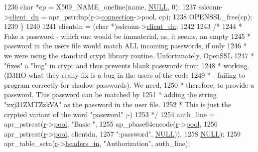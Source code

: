 \begin{DoxyCode}
{1236         \textcolor{keywordtype}{char} *cp = X509\_NAME\_oneline(name, \hyperlink{pcre_8txt_ad7f989d16aa8ca809a36bc392c07fba1}{NULL}, 0);
1237         sslconn->\hyperlink{structSSLConnRec_a2a646856abf462c90dfbe70e82e52173}{client\_dn} = apr\_pstrdup(\hyperlink{group__APACHE__CORE__CONFIG_ga091cdd45984e865a888a4f8bb8fe107a}{r}->\hyperlink{structrequest__rec_a0924aae55826638314f76952ca5d60b1}{connection}->pool, cp);
1238         OPENSSL\_free(cp);
1239     \}
1240 
1241     clientdn = (\textcolor{keywordtype}{char} *)sslconn->\hyperlink{structSSLConnRec_a2a646856abf462c90dfbe70e82e52173}{client\_dn};
1242 
1243     \textcolor{comment}{/*}
1244 \textcolor{comment}{     * Fake a password - which one would be immaterial, as, it seems, an empty}
1245 \textcolor{comment}{     * password in the users file would match ALL incoming passwords, if only}
1246 \textcolor{comment}{     * we were using the standard crypt library routine. Unfortunately, OpenSSL}
1247 \textcolor{comment}{     * "fixes" a "bug" in crypt and thus prevents blank passwords from}
1248 \textcolor{comment}{     * working.  (IMHO what they really fix is a bug in the users of the code}
1249 \textcolor{comment}{     * - failing to program correctly for shadow passwords).  We need,}
1250 \textcolor{comment}{     * therefore, to provide a password. This password can be matched by}
1251 \textcolor{comment}{     * adding the string "xxj31ZMTZzkVA" as the password in the user file.}
1252 \textcolor{comment}{     * This is just the crypted variant of the word "password" ;-)}
1253 \textcolor{comment}{     */}
1254     auth\_line = apr\_pstrcat(\hyperlink{group__APACHE__CORE__CONFIG_ga091cdd45984e865a888a4f8bb8fe107a}{r}->\hyperlink{structrequest__rec_aa0a0c16f9a9ab3901cdb3f3c9c9d83d0}{pool}, \textcolor{stringliteral}{"Basic "},
1255                             ap\_pbase64encode(\hyperlink{group__APACHE__CORE__CONFIG_ga091cdd45984e865a888a4f8bb8fe107a}{r}->\hyperlink{structrequest__rec_aa0a0c16f9a9ab3901cdb3f3c9c9d83d0}{pool},
1256                                              apr\_pstrcat(\hyperlink{group__APACHE__CORE__CONFIG_ga091cdd45984e865a888a4f8bb8fe107a}{r}->\hyperlink{structrequest__rec_aa0a0c16f9a9ab3901cdb3f3c9c9d83d0}{pool}, clientdn,
1257                                                          \textcolor{stringliteral}{":password"}, \hyperlink{pcre_8txt_ad7f989d16aa8ca809a36bc392c07fba1}{NULL})),
1258                             \hyperlink{pcre_8txt_ad7f989d16aa8ca809a36bc392c07fba1}{NULL});
1259     apr\_table\_setn(\hyperlink{group__APACHE__CORE__CONFIG_ga091cdd45984e865a888a4f8bb8fe107a}{r}->\hyperlink{structrequest__rec_a5497da6c01af49acf70a4a9b975c1c83}{headers\_in}, \textcolor{stringliteral}{"Authorization"}, auth\_line);
}
\end{DoxyCode}
